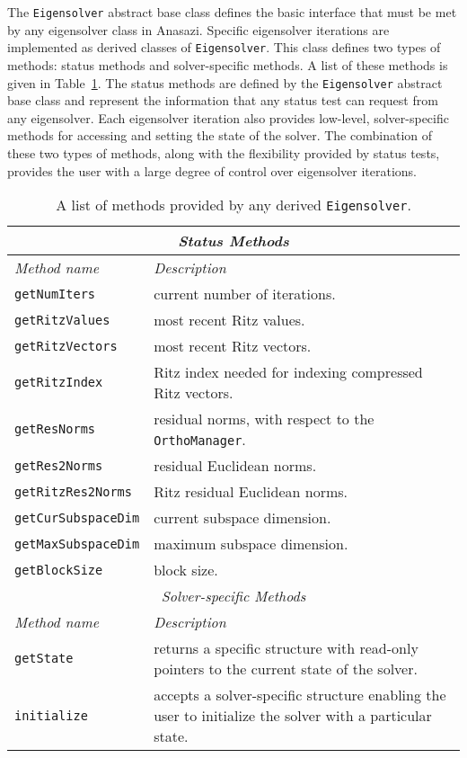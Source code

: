 \documentclass[acmtoms]{acmtrans2m}
\newcommand{\aspace}[1]{\texttt{#1}}
\begin{document}
The \aspace{Eigensolver} abstract base class defines the basic interface that must be met
by any eigensolver class in Anasazi. Specific eigensolver iterations are implemented as derived
classes of \aspace{Eigensolver}.  This class
defines two types of methods: status methods and
solver-specific methods. A list of these methods is given in Table~\ref{tab:anasazi:itermethods}.
The status methods are defined by the \aspace{Eigensolver}
abstract base class and represent the information that any status test can request from
any eigensolver.  Each eigensolver iteration also provides low-level, 
solver-specific methods for accessing and setting the state of the solver.
The combination of these two types of methods, along with the flexibility
provided by status tests, provides the user with a large degree of
control over eigensolver iterations.


\begin{table}[htp]
\begin{center}
\caption{A list of methods provided by any derived
\aspace{Eigensolver}.} \label{tab:anasazi:itermethods}
\begin{tabular}{| p{3cm} | p{6cm} |}
\hline
\multicolumn{2}{|c|}{\emph{Status Methods}} \\
\hline
\emph{Method name} & \emph{Description} \\
\hline
{\tt getNumIters}       & current number of iterations. \\
{\tt getRitzValues}     & most recent Ritz values. \\
{\tt getRitzVectors}    & most recent Ritz vectors. \\
{\tt getRitzIndex}      & Ritz index needed for indexing compressed Ritz vectors. \\
{\tt getResNorms}       & residual norms, with respect to the \aspace{OrthoManager}. \\
{\tt getRes2Norms}      & residual Euclidean norms. \\
{\tt getRitzRes2Norms}  & Ritz residual  Euclidean norms. \\
{\tt getCurSubspaceDim} & current subspace dimension. \\
{\tt getMaxSubspaceDim} & maximum subspace dimension. \\
{\tt getBlockSize}      & block size. \\
\hline
\multicolumn{2}{|c|}{\emph{Solver-specific Methods}} \\
\hline
\emph{Method name} & \emph{Description} \\
\hline
{\tt getState}       & returns a specific structure with read-only pointers to
                       the current state of the solver. \\
{\tt initialize}     & accepts a solver-specific structure enabling the user to initialize
                       the solver with a particular state.\\
\hline
\end{tabular}
\end{center}
\end{table}
\end{document}
